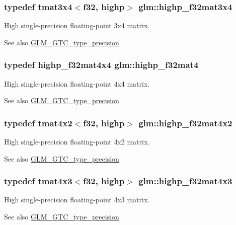 \subsubsection[{highp\+\_\+f32mat3x4}]{\setlength{\rightskip}{0pt plus 5cm}typedef tmat3x4$<${\bf f32}, highp$>$ {\bf glm\+::highp\+\_\+f32mat3x4}}\label{namespaceglm_a263a7304ad89c61bc70ede5ac2232ef3}
High single-\/precision floating-\/point 3x4 matrix. \begin{DoxySeeAlso}{See also}
\hyperlink{group__gtc__type__precision}{G\+L\+M\+\_\+\+G\+T\+C\+\_\+type\+\_\+precision} 
\end{DoxySeeAlso}
\hypertarget{namespaceglm_ac14c1bfb647e39d459c7489ede2156cc}{}
\subsubsection[{highp\+\_\+f32mat4}]{\setlength{\rightskip}{0pt plus 5cm}typedef {\bf highp\+\_\+f32mat4x4} {\bf glm\+::highp\+\_\+f32mat4}}\label{namespaceglm_ac14c1bfb647e39d459c7489ede2156cc}
High single-\/precision floating-\/point 4x4 matrix. \begin{DoxySeeAlso}{See also}
\hyperlink{group__gtc__type__precision}{G\+L\+M\+\_\+\+G\+T\+C\+\_\+type\+\_\+precision} 
\end{DoxySeeAlso}
\hypertarget{namespaceglm_a7f365f980be86c2b8063cd13291653d6}{}
\subsubsection[{highp\+\_\+f32mat4x2}]{\setlength{\rightskip}{0pt plus 5cm}typedef tmat4x2$<${\bf f32}, highp$>$ {\bf glm\+::highp\+\_\+f32mat4x2}}\label{namespaceglm_a7f365f980be86c2b8063cd13291653d6}
High single-\/precision floating-\/point 4x2 matrix. \begin{DoxySeeAlso}{See also}
\hyperlink{group__gtc__type__precision}{G\+L\+M\+\_\+\+G\+T\+C\+\_\+type\+\_\+precision} 
\end{DoxySeeAlso}
\hypertarget{namespaceglm_a03b4316160ac40bf259a553f719bca24}{}
\subsubsection[{highp\+\_\+f32mat4x3}]{\setlength{\rightskip}{0pt plus 5cm}typedef tmat4x3$<${\bf f32}, highp$>$ {\bf glm\+::highp\+\_\+f32mat4x3}}\label{namespaceglm_a03b4316160ac40bf259a553f719bca24}
High single-\/precision floating-\/point 4x3 matrix. \begin{DoxySeeAlso}{See also}
\hyperlink{group__gtc__type__precision}{G\+L\+M\+\_\+\+G\+T\+C\+\_\+type\+\_\+precision} 
\end{DoxySeeAlso}
\hypertarget{namespaceglm_a843cbcb73e74d599cdbadc97d0478539}{}
